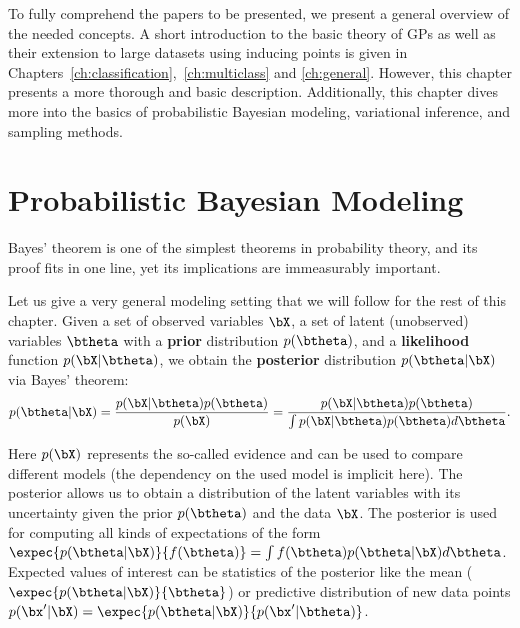 


\graphicspath{{2_background/figures/}}

To fully comprehend the papers to be presented, we present a general overview of the needed concepts.
A short introduction to the basic theory of \acl{GPs} as well as their extension to large datasets using inducing points \cite{Titsias2009} is given in Chapters~\ref{ch:classification},~\ref{ch:multiclass} and \ref{ch:general}.
However, this chapter presents a more thorough and basic description.
Additionally, this chapter dives more into the basics of probabilistic Bayesian modeling, variational inference, and sampling methods.

\section{Probabilistic Bayesian Modeling}

\label{sec:prob_bayes}

Bayes' theorem is one of the simplest theorems in probability theory, and its proof fits in one line, yet its implications are immeasurably important.

Let us give a very general modeling setting that we will follow for the rest of this chapter.
Given a set of observed variables $\bX$, a set of latent (unobserved) variables $\btheta$ with a \textbf{prior} distribution $p(\btheta)$, and a \textbf{likelihood} function $p(\bX|\btheta)$, we obtain the \textbf{posterior} distribution $p(\btheta|\bX)$ via Bayes' theorem:
\begin{align}
p(\btheta|\bX) = \frac{p(\bX|\btheta)p(\btheta)}{p(\bX)} = \frac{p(\bX|\btheta)p(\btheta)}{\int p(\bX|\btheta)p(\btheta)d\btheta}.
\label{eq:bayes}
\end{align}

Here $p(\bX)$ represents the so-called evidence and can be used to compare different models (the dependency on the used model is implicit here).
The posterior allows us to obtain a distribution of the latent variables with its uncertainty given the prior $p(\btheta)$ and the data $\bX$.
The posterior is used for computing all kinds of expectations of the form $\expec{p(\btheta|\bX)}{f(\btheta)} = \int f(\btheta)p(\btheta|\bX)d\btheta$.
Expected values of interest can be statistics of the posterior like the mean ($\expec{p(\btheta|\bX)}{\btheta}$) or predictive distribution of new data points $p(\bx'|\bX) = \expec{p(\btheta|\bX)}{p(\bx'|\btheta)}$.

